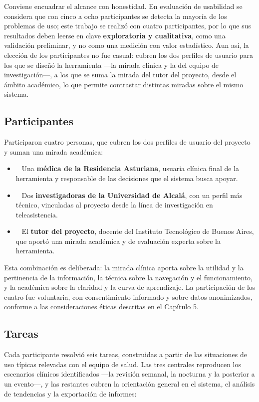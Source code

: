 Conviene encuadrar el alcance con honestidad. En evaluación de usabilidad se considera que con cinco a ocho participantes se detecta la mayoría de los problemas de uso; este trabajo se realizó con cuatro participantes, por lo que sus resultados deben leerse en clave \textbf{exploratoria y cualitativa}, como una validación preliminar, y no como una medición con valor estadístico. Aun así, la elección de los participantes no fue casual: cubren los dos perfiles de usuario para los que se diseñó la herramienta —la mirada clínica y la del equipo de investigación—, a los que se suma la mirada del tutor del proyecto, desde el ámbito académico, lo que permite contrastar distintas miradas sobre el mismo sistema.\\


\subsection{Participantes}
Participaron cuatro personas, que cubren los dos perfiles de usuario del proyecto y suman una mirada académica:\\


\begin{itemize}
\item~ Una \textbf{médica de la Residencia Asturiana}, usuaria clínica final de la herramienta y responsable de las decisiones que el sistema busca apoyar.
\item~ Dos \textbf{investigadoras de la Universidad de Alcalá}, con un perfil más técnico, vinculadas al proyecto desde la línea de investigación en teleasistencia.
\item~ El \textbf{tutor del proyecto}, docente del Instituto Tecnológico de Buenos Aires, que aportó una mirada académica y de evaluación experta sobre la herramienta.
\end{itemize}
Esta combinación es deliberada: la mirada clínica aporta sobre la utilidad y la pertinencia de la información, la técnica sobre la navegación y el funcionamiento, y la académica sobre la claridad y la curva de aprendizaje. La participación de los cuatro fue voluntaria, con consentimiento informado y sobre datos anonimizados, conforme a las consideraciones éticas descritas en el Capítulo 5.\\


\subsection{Tareas}
Cada participante resolvió seis tareas, construidas a partir de las situaciones de uso típicas relevadas con el equipo de salud. Las tres centrales reproducen los escenarios clínicos identificados —la revisión semanal, la nocturna y la posterior a un evento—, y las restantes cubren la orientación general en el sistema, el análisis de tendencias y la exportación de informes:\\


